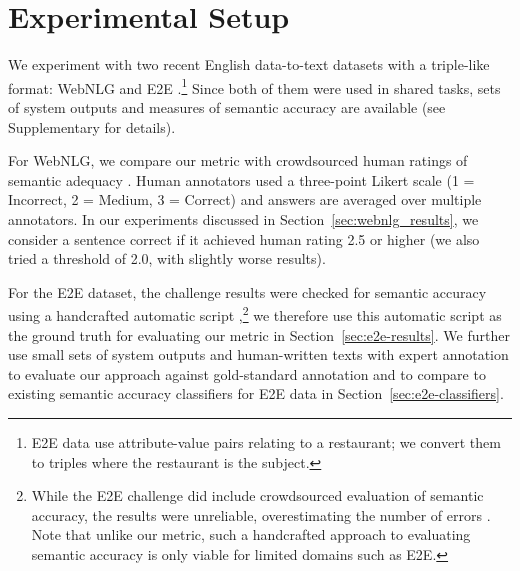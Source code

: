 \section{Experimental Setup}
\label{sec:experiments}





We experiment with two recent English data-to-text datasets with a triple-like format: WebNLG \cite{gardent2017webnlg} and E2E \cite{novikova-etal-2017-e2e}.\footnote{E2E data use attribute-value pairs relating to a restaurant; we convert them to triples where the restaurant is the subject.} Since both of them were used in shared tasks, sets of system outputs and measures of semantic accuracy are available (see Supplementary for details).

For WebNLG, we compare our metric with crowdsourced human ratings of semantic adequacy \cite{shimorina2019webnlg}. %
Human annotators used
a three-point Likert scale (1 = Incorrect, 2 = Medium, 3 = Correct) and answers are averaged over multiple annotators. In our experiments discussed in Section~\ref{sec:webnlg_results}, we consider a sentence correct if it achieved human rating 2.5 or higher (we also tried a threshold of 2.0, with slightly worse results).

For the E2E dataset, the challenge results were checked for semantic accuracy using a handcrafted automatic script \cite{duvsek2020evaluating},\footnote{While the E2E challenge did include crowdsourced evaluation of semantic accuracy, the results were unreliable, overestimating the number of errors \cite{duvsek2020evaluating}. Note that unlike our metric, such a handcrafted approach to evaluating semantic accuracy is only viable for limited domains such as E2E.%
} we therefore use this automatic script as the ground truth for evaluating our metric in Section~\ref{sec:e2e-results}.
We further use small sets of system outputs and human-written texts with expert annotation \citep[provided by][]{dusek_semantic_2019} to evaluate our approach against gold-standard annotation and to compare to existing semantic accuracy classifiers for E2E data in Section~\ref{sec:e2e-classifiers}.


